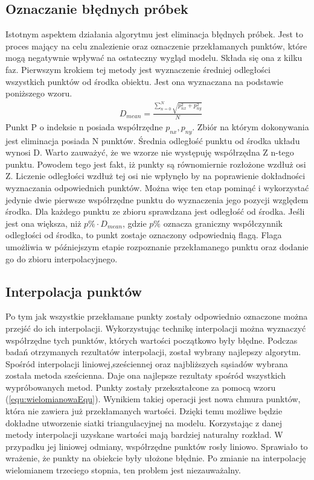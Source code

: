 \subsection{Oznaczanie błędnych próbek}
Istotnym aspektem działania algorytmu jest eliminacja błędnych próbek. Jest to proces mający na celu znalezienie oraz oznaczenie przekłamanych punktów, które mogą negatywnie wpływać na ostateczny wygląd modelu. Składa się ona z kilku faz.
\newline \indent Pierwszym krokiem tej metody jest wyznaczenie średniej odległości wszystkich punktów od środka obiektu. Jest ona wyznaczana na podstawie poniższego wzoru.
\begin{equation}
    \begin{aligned}
            &D_{mean}=\frac{\sum_{n=0}^{N} \sqrt{p_{nx}^2+p_{ny}^2}}{N}  
    \end{aligned}
\end{equation}
\indent Punkt P o indeksie n posiada współrzędne $p_{nx},p_{ny}$. Zbiór na którym dokonywania jest eliminacja posiada N punktów. Średnia odległość punktu od środka układu wynosi D.
\newline \indent Warto zauważyć, że we wzorze nie występuję współrzędna Z n-tego punktu. Powodem tego jest fakt, iż punkty są równomiernie rozłożone wzdłuż osi Z. Liczenie odległości wzdłuż tej osi nie wpłynęło by na poprawienie dokładności wyznaczania odpowiednich punktów. Można więc ten etap pominąć i wykorzystać jedynie dwie pierwsze współrzędne punktu do wyznaczenia jego pozycji względem środka.
\newline \indent Dla każdego punktu ze zbioru sprawdzana jest odległość od środka. Jeśli jest ona większa, niż $p\% \cdot D_{mean}$, gdzie $p\%$ oznacza graniczny współczynnik odległości od środka, to punkt zostaje oznaczony odpowiednią flagą. Flaga umożliwia w późniejszym etapie rozpoznanie przekłamanego punktu oraz dodanie go do zbioru interpolacyjnego.
\subsection{Interpolacja punktów}
Po tym jak wszystkie przekłamane punkty zostały odpowiednio oznaczone można przejść do ich interpolacji. Wykorzystując technikę interpolacji można wyznaczyć współrzędne tych punktów, których wartości początkowo były błędne. Podczas badań otrzymanych rezultatów interpolacji, został wybrany najlepszy algorytm. Spośród interpolacji liniowej,sześciennej oraz najbliższych sąsiadów wybrana została metoda sześcienna. Daje ona najlepsze rezultaty spośród wszystkich wypróbowanych metod. Punkty zostały przekształcone za pomocą wzoru (\ref{equ:wielomianowaEqu}). Wynikiem takiej operacji jest nowa chmura punktów, która nie zawiera już przekłamanych wartości. Dzięki temu możliwe będzie dokładne utworzenie siatki triangulacyjnej na modelu. Korzystając z danej metody interpolacji uzyskane wartości mają bardziej naturalny rozkład. W przypadku jej liniowej odmiany, współrzędne punktów rosły liniowo. Sprawiało to wrażenie, że punkty na obiekcie były ułożone błędnie. Po zmianie na interpolację wielomianem trzeciego stopnia, ten problem jest niezauważalny.  
